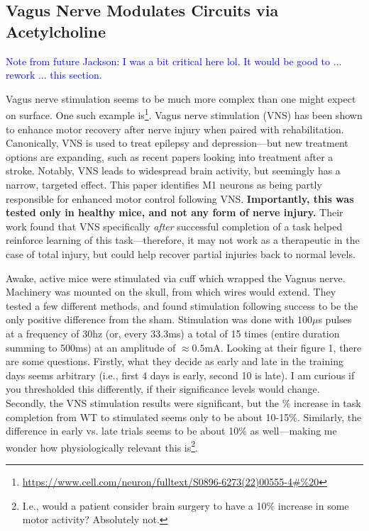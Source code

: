 \subsection{Vagus Nerve Modulates Circuits via Acetylcholine}

\textcolor{blue}{Note from future Jackson: I was a bit critical here lol. It would be good to ... rework ... this section.}\newline

Vagus nerve stimulation seems to be much more complex than one might expect on surface. One such example is\footnote{\url{https://www.cell.com/neuron/fulltext/S0896-6273(22)00555-4\#\%20}}. Vagus nerve stimulation (VNS) has been shown to enhance motor recovery after nerve injury when paired with rehabilitation. Canonically, VNS is used to treat epilepsy and depression---but new treatment options are expanding, such as recent papers looking into treatment after a stroke. Notably, VNS leads to widespread brain activity, but seemingly has a narrow, targeted effect. This paper identifies M1 neurons as being partly responsible for enhanced motor control following VNS. \textbf{Importantly, this was tested only in healthy mice, and not any form of nerve injury.} Their work found that VNS specifically \textit{after} successful completion of a task helped reinforce learning of this task---therefore, it may not work as a therapeutic in the case of total injury, but could help recover partial injuries back to normal levels.\newline

Awake, active mice were stimulated via cuff which wrapped the Vagnus nerve. Machinery was mounted on the skull, from which wires would extend. They tested a few different methods, and found stimulation following success to be the only positive difference from the sham. Stimulation was done with $100\mu$s pulses at a frequency of 30hz (or, every 33.3ms) a total of 15 times (entire duration summing to 500ms) at an amplitude of $\approx 0.5$mA. Looking at their figure 1, there are some questions. Firstly, what they decide as early and late in the training days seems arbitrary (i.e., first 4 days is early, second 10 is late). I am curious if you thresholded this differently, if their significance levels would change. Secondly, the VNS stimulation results were significant, but the \% increase in task completion from WT to stimulated seems only to be about 10-15\%. Similarly, the difference in early vs. late trials seems to be about 10\% as well---making me wonder how physiologically relevant this is\footnote{I.e., would a patient consider brain surgery to have a 10\% increase in some motor activity? Absolutely not.}.\newline

